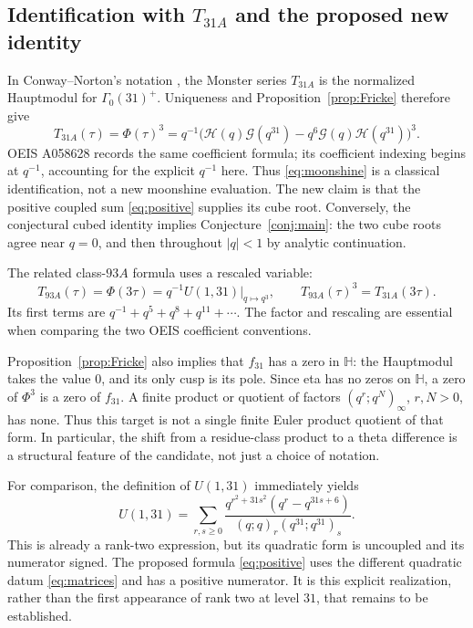 \documentclass[11pt,reqno]{amsart}
\newcommand{\HH}{\mathbb H}
\newcommand{\RG}{\mathcal G}
\newcommand{\RH}{\mathcal H}
\theoremstyle{remark}
\numberwithin{equation}{section}
\begin{document}
\subsection*{Identification with \texorpdfstring{$T_{31A}$}{T31A} and the proposed new identity}
In Conway--Norton's notation \cite{CN}, the Monster series $T_{31A}$
is the normalized Hauptmodul for $\Gamma_0(31)^+$. Uniqueness and
Proposition~\ref{prop:Fricke} therefore give
\begin{equation}\label{eq:moonshine}
 T_{31A}(\tau)=\Phi(\tau)^3
 =q^{-1}\bigl(\RH(q)\RG(q^{31})-q^6\RG(q)\RH(q^{31})\bigr)^3.
\end{equation}
OEIS A058628 \cite{OEIS31} records the same coefficient formula;
its coefficient indexing begins at $q^{-1}$, accounting for the
explicit $q^{-1}$ here. Thus \eqref{eq:moonshine} is a classical
identification, not a new moonshine evaluation. The new claim is that
the positive coupled sum \eqref{eq:positive} supplies its cube root.
Conversely, the conjectural cubed identity implies
Conjecture~\ref{conj:main}: the two cube roots agree near $q=0$, and
then throughout $|q|<1$ by analytic continuation.

The related class-$93A$ formula \cite{OEIS93} uses a rescaled variable:
\begin{equation}\label{eq:moonshine93}
 T_{93A}(\tau)=\Phi(3\tau)=q^{-1}U(1,31)\big|_{q\mapsto q^3},
 \qquad T_{93A}(\tau)^3=T_{31A}(3\tau).
\end{equation}
Its first terms are $q^{-1}+q^5+q^8+q^{11}+\cdots$.
The factor and rescaling are essential when comparing the two
OEIS coefficient conventions.

Proposition~\ref{prop:Fricke} also implies that $f_{31}$ has a zero
in $\HH$: the Hauptmodul takes the value $0$, and its only cusp is
its pole. Since eta has no zeros on $\HH$, a zero of $\Phi^3$ is a
zero of $f_{31}$. A finite product or quotient
of factors $(q^r;q^N)_\infty$, $r,N>0$, has none. Thus this target is
not a single finite Euler product quotient of that form. In particular,
the shift from a residue-class product to a theta difference is a
structural feature of the candidate, not just a choice of notation.

For comparison, the definition of $U(1,31)$ immediately yields
\begin{equation}\label{eq:uncoupled}
 U(1,31)=\sum_{r,s\geq0}
 \frac{q^{r^2+31s^2}(q^r-q^{31s+6})}
 {(q;q)_r(q^{31};q^{31})_s}.
\end{equation}
This is already a rank-two expression, but its quadratic form is
uncoupled and its numerator signed. The proposed formula
\eqref{eq:positive} uses the different quadratic datum
\eqref{eq:matrices} and has a positive numerator. It is this explicit
realization, rather than the first appearance of rank two at level $31$,
that remains to be established.
\end{document}
